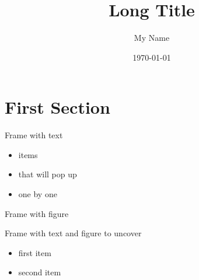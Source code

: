 \documentclass[12pt,aspectratio=1610]{beamer}
\title[Short Title]{Long Title}
\author{My Name}
\institute{Climate and Geophysics, Team Ocean, Niels Bohr Institute}
\date{\today}
\begin{document}
\frame[plain]{\titlepage}


\section{First Section}


\begin{frame}{Frame with text}
\begin{itemize}[<+->]
	\item items
	\item that will pop up
	\item one by one
\end{itemize}
\end{frame}


\begin{frame}{Frame with figure}
\begin{figure}
\def\figheight{0.8\textheight}
\end{figure}
\end{frame}


\begin{frame}{Frame with text and figure to uncover}
\begin{itemize}[<+->]
	\item first item
	\item second item
\end{itemize}
\end{frame}




\end{document}
